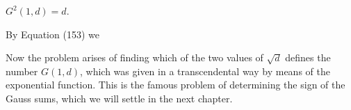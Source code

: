 $G^2(1, d) = d$.

By Equation (153) we

Now the problem arises of finding which of the two values of $\sqrt{d}$ defines the number $G(1, d)$, which was given in a transcendental way by means of the exponential function. This is the famous problem of determining the sign of the Gauss sums, which we will settle in the next chapter.
